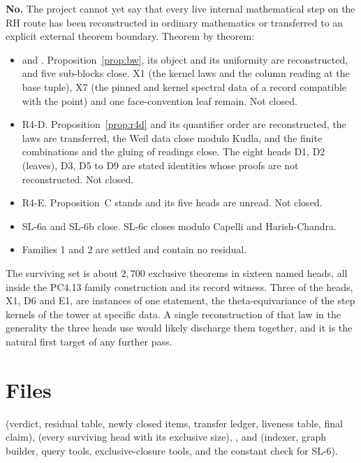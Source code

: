 \documentclass[11pt]{article}
\newcommand{\SL}[1]{\textsf{SL-#1}}
\theoremstyle{remark}
\begin{document}
\textbf{No.} The project cannot yet say that every live internal mathematical step on the RH route has been reconstructed in ordinary mathematics or transferred to an explicit external theorem boundary. Theorem by theorem:
\begin{itemize}[nosep]
\item {} and . Proposition~\ref{prop:bw}, its object and its uniformity are reconstructed, and five sub-blocks close. X1 (the kernel laws and the column reading at the base tuple), X7 (the pinned and kernel spectral data of a record compatible with the point) and one face-convention leaf remain. Not closed.
\item R4-D. Proposition~\ref{prop:r4d} and its quantifier order are reconstructed, the laws are transferred, the Weil data close modulo Kudla, and the finite combinations and the gluing of readings close. The eight heads D1, D2 (leaves), D3, D5 to D9 are stated identities whose proofs are not reconstructed. Not closed.
\item R4-E. Proposition~C stands and its five heads are unread. Not closed.
\item \SL{6}a and \SL{6}b close. \SL{6}c closes modulo Capelli and Harish-Chandra.
\item Families 1 and 2 are settled and contain no residual.
\end{itemize}
The surviving set is about $2{,}700$ exclusive theorems in sixteen named heads, all inside the PC4.13 family construction and its record witness. Three of the heads, X1, D6 and E1, are instances of one statement, the theta-equivariance of the step kernels of the tower at specific data. A single reconstruction of that law in the generality the three heads use would likely discharge them together, and it is the natural first target of any further pass.

\section*{Files}

 (verdict, residual table, newly closed items, transfer ledger, liveness table, final claim),  (every surviving head with its exclusive size), , and  (indexer, graph builder, query tools, exclusive-closure tools, and the constant check for SL-6).
\end{document}
